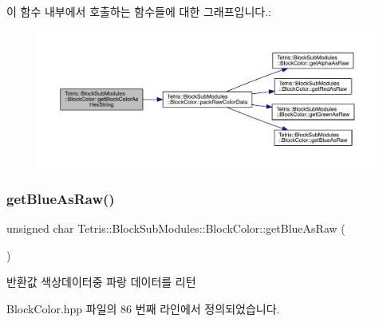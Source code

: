 이 함수 내부에서 호출하는 함수들에 대한 그래프입니다.\+:
\nopagebreak
\begin{figure}[H]
\begin{center}
\leavevmode
\includegraphics[width=350pt]{class_tetris_1_1_block_sub_modules_1_1_block_color_a79cc837f207645628542876997c9e919_cgraph}
\end{center}
\end{figure}
\mbox{\label{class_tetris_1_1_block_sub_modules_1_1_block_color_ac0ad44a8b001f3824447d137357f5145}} 
\subsubsection{\texorpdfstring{get\+Blue\+As\+Raw()}{getBlueAsRaw()}}
{\footnotesize\ttfamily unsigned char Tetris\+::\+Block\+Sub\+Modules\+::\+Block\+Color\+::get\+Blue\+As\+Raw (\begin{DoxyParamCaption}{ }\end{DoxyParamCaption})\hspace{0.3cm}{\ttfamily [inline]}}

\begin{DoxyReturn}{반환값}
색상데이터중 파랑 데이터를 리턴 
\end{DoxyReturn}


Block\+Color.\+hpp 파일의 86 번째 라인에서 정의되었습니다.

